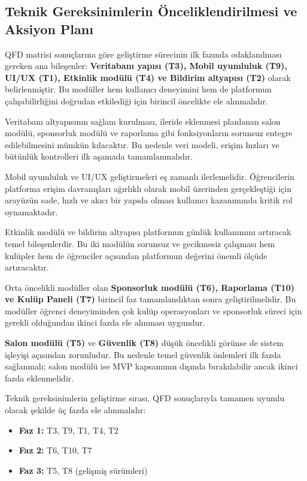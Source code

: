 \documentclass[a4paper,12pt]{report}
\begin{document}
\subsection{Teknik Gereksinimlerin Önceliklendirilmesi ve Aksiyon Planı}

QFD matrisi sonuçlarına göre geliştirme sürecinin ilk fazında odaklanılması gereken ana bileşenler: \textbf{Veritabanı yapısı (T3), Mobil uyumluluk (T9), UI/UX (T1), Etkinlik modülü (T4) ve Bildirim altyapısı (T2)} olarak belirlenmiştir. Bu modüller hem kullanıcı deneyimini hem de platformun çalışabilirliğini doğrudan etkilediği için birincil öncelikte ele alınmalıdır.

Veritabanı altyapısının sağlam kurulması, ileride eklenmesi planlanan salon modülü, sponsorluk modülü ve raporlama gibi fonksiyonların sorunsuz entegre edilebilmesini mümkün kılacaktır. Bu nedenle veri modeli, erişim hızları ve bütünlük kontrolleri ilk aşamada tamamlanmalıdır.

Mobil uyumluluk ve UI/UX geliştirmeleri eş zamanlı ilerlemelidir. Öğrencilerin platforma erişim davranışları ağırlıklı olarak mobil üzerinden gerçekleştiği için arayüzün sade, hızlı ve akıcı bir yapıda olması kullanıcı kazanımında kritik rol oynamaktadır.

Etkinlik modülü ve bildirim altyapısı platformun günlük kullanımını artıracak temel bileşenlerdir. Bu iki modülün sorunsuz ve gecikmesiz çalışması hem kulüpler hem de öğrenciler açısından platformun değerini önemli ölçüde artıracaktır.

Orta öncelikli modüller olan \textbf{Sponsorluk modülü (T6), Raporlama (T10) ve Kulüp Paneli (T7)} birincil faz tamamlandıktan sonra geliştirilmelidir. Bu modüller öğrenci deneyiminden çok kulüp operasyonları ve sponsorluk süreci için gerekli olduğundan ikinci fazda ele alınması uygundur.

\textbf{Salon modülü (T5)} ve \textbf{Güvenlik (T8)} düşük öncelikli görünse de sistem işleyişi açısından zorunludur. Bu nedenle temel güvenlik önlemleri ilk fazda sağlanmalı; salon modülü ise MVP kapsamının dışında bırakılabilir ancak ikinci fazda eklenmelidir.

Teknik gereksinimlerin geliştirme sırası, QFD sonuçlarıyla tamamen uyumlu olacak şekilde üç fazda ele alınmalıdır:

\begin{itemize}
    \item \textbf{Faz 1:} T3, T9, T1, T4, T2
    \item \textbf{Faz 2:} T6, T10, T7
    \item \textbf{Faz 3:} T5, T8 (gelişmiş sürümleri)
\end{itemize}
\end{document}
